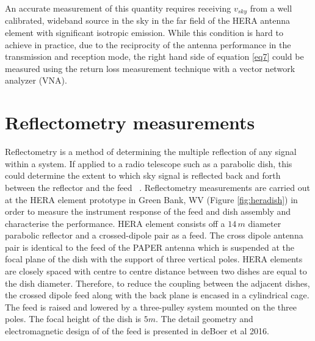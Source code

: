 \documentclass[twocolumn]{emulateapj}
\newcommand{\volt}{{v}}
\newcommand{\dfngexp}{{e^{2\pi i\nu \Delta \tau}}}
\begin{document}
    
    An accurate measurement of this quantity requires receiving $v_{sky}$ from a
    well calibrated, wideband source in the sky in the far field of the HERA
    antenna element with significant isotropic emission. While this condition is
    hard to achieve in practice, due to the reciprocity of the antenna performance
    in the transmission and reception mode, the right hand side of equation
    \ref{eq7} could be measured using the return loss measurement technique with a
    vector network analyzer (VNA). \\
    
    \section{\textbf{Reflectometry measurements}} 
    
    Reflectometry is a method of determining the multiple reflection of any signal within a system. 
    If applied to a radio telescope such as a parabolic dish, this could determine the extent to which 
    sky signal is reflected back and forth between the reflector and the feed ~\citep{2015arXiv150205862P}.
    Reflectometry measurements are carried out at the HERA element prototype in
    Green Bank, WV (Figure \ref{fig:heradish}) in order to measure the instrument
    response of the feed and dish assembly and characterise the performance.  HERA
    element consists off a $14\,m$ diameter parabolic reflector and a
    crossed-dipole pair as a feed. The cross dipole antenna pair is identical to
    the feed of the PAPER antenna which is suspended at the focal plane of the dish
    with the support of three vertical poles. HERA elements are closely spaced with
    centre to centre distance between two dishes are equal to the dish diameter.
    Therefore, to reduce the coupling between the adjacent dishes, the crossed
    dipole feed along with the back plane is encased in a cylindrical cage. The
    feed is raised and lowered by a three-pulley system mounted on the three poles.
    The focal height of the dish is $5m$.  The detail geometry and electromagnetic
    design of of the feed is presented in deBoer et al 2016. \\
    
\end{document}
